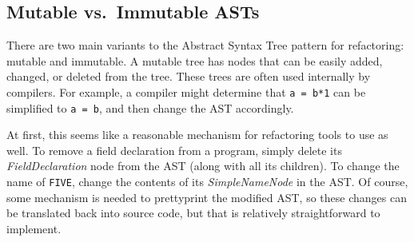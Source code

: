 \documentclass[prodmode]{acmlarge}
\newcommand{\ttt}[1]{\texttt{#1}}
\newcommand{\code}[1]{\texttt{#1}}
\begin{document}
%
%


\subsection{Mutable vs.\ Immutable ASTs}
\label{ss:manip}

There are two main variants to the Abstract Syntax Tree pattern for refactoring:
mutable and immutable. A mutable tree has nodes that can be easily added, 
changed, or deleted from the tree. These trees are often used internally by
compilers. For example, a compiler might determine that
\ttt{a~=~b*1} can be simplified to \ttt{a~=~b}, and then change the AST 
accordingly.

At first, this seems like a reasonable mechanism for refactoring tools to use
as well.  To remove a field declaration from a program, simply delete its
\textit{FieldDeclaration} node from the AST (along with all its children).  To
change the name of \ttt{FIVE}, change the contents of its
\textit{SimpleNameNode} in the AST.  Of course, some mechanism is needed to
prettyprint the modified AST, so these changes can be translated back into
source code, but that is relatively straightforward to implement.
\end{document}
